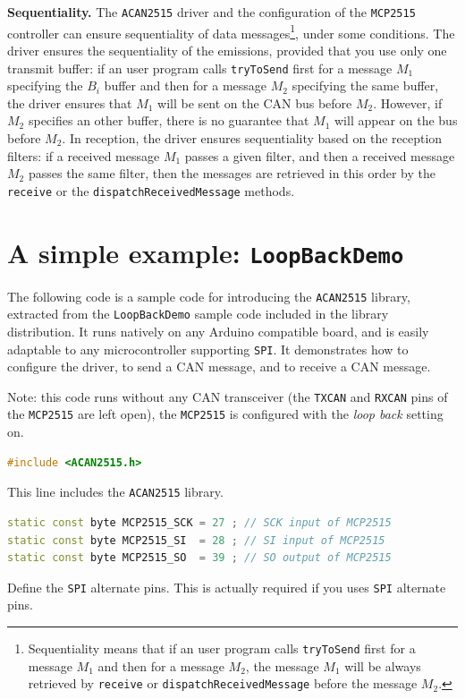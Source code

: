 \documentclass[10pt, a4paper, obeyspaces]{extarticle}
\begin{document}
{\bf Sequentiality.} The \texttt{ACAN2515} driver and the configuration of the \texttt{MCP2515} controller can ensure sequentiality of data messages\footnote{Sequentiality means that if an user program calls \texttt{tryToSend} first for a message $M_1$ and then for a message $M_2$, the message $M_1$ will be always retrieved by \texttt{receive} or \texttt{dispatchReceivedMessage} before the message $M_2$.}, under some conditions. The driver ensures the sequentiality of the emissions, provided that you use only one transmit buffer: if an user program calls \texttt{tryToSend} first for a message $M_1$ specifying the $B_i$ buffer and then for a message $M_2$ specifying the same buffer, the driver ensures that $M_1$ will be sent on the CAN bus before $M_2$. However, if $M_2$ specifies an other buffer, there is no guarantee that $M_1$ will appear on the bus before $M_2$. In reception, the driver ensures sequentiality based on the reception filters: if a received message $M_1$ passes a given filter, and then a received message $M_2$ passes the same filter, then the messages are retrieved in this order by the \texttt{receive} or the \texttt{dispatchReceivedMessage} methods.



\section{A simple example: \texttt{LoopBackDemo}}

The following code is a sample code for introducing the \texttt{ACAN2515} library, extracted from the \texttt{LoopBackDemo} sample code included in the library distribution. It runs natively on any Arduino compatible board, and is easily adaptable to any microcontroller supporting \texttt{SPI}. It demonstrates how to configure the driver, to send a CAN message, and to receive a CAN message.

Note: this code runs without any CAN transceiver (the \texttt{TXCAN} and \texttt{RXCAN} pins of the \texttt{MCP2515} are left open), the \texttt{MCP2515} is configured with the \emph{loop back} setting on.

{ \small\begin{lstlisting}[language=c++]
#include <ACAN2515.h>
\end{lstlisting}}

This line includes the \texttt{ACAN2515} library.

{ \small\begin{lstlisting}[language=c++]
static const byte MCP2515_SCK = 27 ; // SCK input of MCP2515 
static const byte MCP2515_SI  = 28 ; // SI input of MCP2515  
static const byte MCP2515_SO  = 39 ; // SO output of MCP2515 
\end{lstlisting}}
Define the \texttt{SPI} alternate pins. This is actually required if you uses \texttt{SPI} alternate pins.
\end{document}
